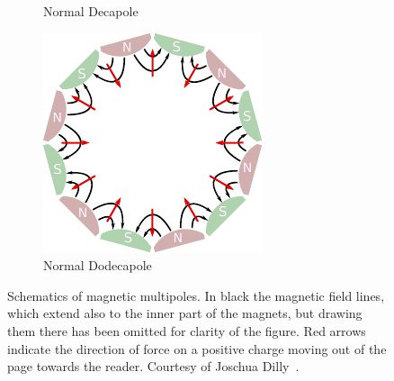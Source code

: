 \begin{figure}[!htb]
\begin{subfigure}{0.243\textwidth}
        \caption{
           Normal Decapole 
        }
        \label{fig:MDNorm}
    \end{subfigure}
    \begin{subfigure}{0.243\textwidth}
        \includegraphics[height=\magnetheight]{images/magnets/dodecapole_normal.pdf}
        \caption{
           Normal Dodecapole 
        }
        \label{fig:MTNorm}
    \end{subfigure}
    \caption{
        Schematics of magnetic multipoles. In black the magnetic field lines,
        which extend also to the inner part of the magnets, 
        but drawing them there has been omitted for clarity of the figure.
        Red arrows indicate the direction of force on a 
        positive charge moving out of the page towards the reader.
        Courtesy of Joschua Dilly~\cite{dilly_corrections_2022}.
    }
    \label{fig:background:magnetic_fields:schematics}
\end{figure}



\subsection{}


